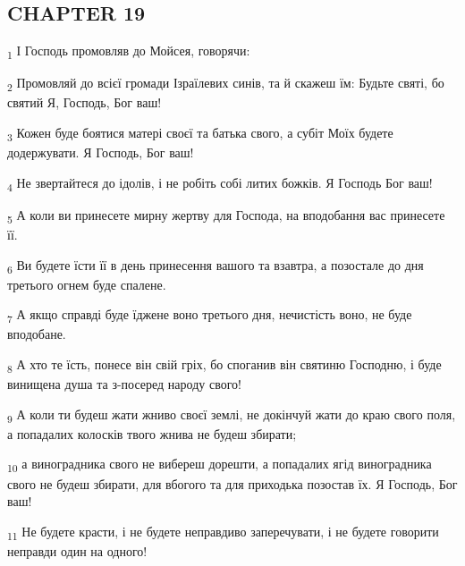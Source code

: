 \subsection{CHAPTER 19}
\begin{tcolorbox}
\textsubscript{1} І Господь промовляв до Мойсея, говорячи:
\end{tcolorbox}
\begin{tcolorbox}
\textsubscript{2} Промовляй до всієї громади Ізраїлевих синів, та й скажеш їм: Будьте святі, бо святий Я, Господь, Бог ваш!
\end{tcolorbox}
\begin{tcolorbox}
\textsubscript{3} Кожен буде боятися матері своєї та батька свого, а субіт Моїх будете додержувати. Я Господь, Бог ваш!
\end{tcolorbox}
\begin{tcolorbox}
\textsubscript{4} Не звертайтеся до ідолів, і не робіть собі литих божків. Я Господь Бог ваш!
\end{tcolorbox}
\begin{tcolorbox}
\textsubscript{5} А коли ви принесете мирну жертву для Господа, на вподобання вас принесете її.
\end{tcolorbox}
\begin{tcolorbox}
\textsubscript{6} Ви будете їсти її в день принесення вашого та взавтра, а позостале до дня третього огнем буде спалене.
\end{tcolorbox}
\begin{tcolorbox}
\textsubscript{7} А якщо справді буде їджене воно третього дня, нечистість воно, не буде вподобане.
\end{tcolorbox}
\begin{tcolorbox}
\textsubscript{8} А хто те їсть, понесе він свій гріх, бо споганив він святиню Господню, і буде винищена душа та з-посеред народу свого!
\end{tcolorbox}
\begin{tcolorbox}
\textsubscript{9} А коли ти будеш жати жниво своєї землі, не докінчуй жати до краю свого поля, а попадалих колосків твого жнива не будеш збирати;
\end{tcolorbox}
\begin{tcolorbox}
\textsubscript{10} а виноградника свого не вибереш дорешти, а попадалих ягід виноградника свого не будеш збирати, для вбогого та для приходька позостав їх. Я Господь, Бог ваш!
\end{tcolorbox}
\begin{tcolorbox}
\textsubscript{11} Не будете красти, і не будете неправдиво заперечувати, і не будете говорити неправди один на одного!
\end{tcolorbox}
